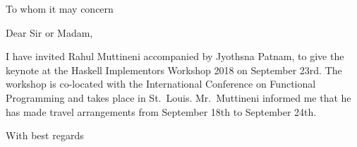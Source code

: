 \documentclass[12pt]{letter}
\begin{document}
\begin{letter}{To whom it may concern
}
\opening{Dear Sir or Madam,}

I have invited Rahul Muttineni accompanied by Jyothsna Patnam, to give the keynote at the Haskell Implementors Workshop 2018 on September 23rd. The workshop is co-located with the International Conference on Functional Programming and takes place in St.\ Louis. Mr.\ Muttineni informed me that he has made travel arrangements from September 18th to September 24th.

\signature{Joachim Breitner\\Chair of the Program Committee}
\closing{With best regards}%
\end{letter}
\end{document}
